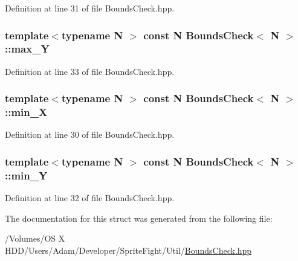 Definition at line 31 of file Bounds\-Check.\-hpp.

\hypertarget{struct_bounds_check_a569066d0fc5179aefddf172605682e72}{
\subsubsection[{max\-\_\-\-Y}]{\setlength{\rightskip}{0pt plus 5cm}template$<$typename N $>$ const N {\bf Bounds\-Check}$<$ N $>$\-::max\-\_\-\-Y}}\label{struct_bounds_check_a569066d0fc5179aefddf172605682e72}


Definition at line 33 of file Bounds\-Check.\-hpp.

\hypertarget{struct_bounds_check_a7ddafd0ac07f6ddfbd357f8bd440e952}{
\subsubsection[{min\-\_\-\-X}]{\setlength{\rightskip}{0pt plus 5cm}template$<$typename N $>$ const N {\bf Bounds\-Check}$<$ N $>$\-::min\-\_\-\-X}}\label{struct_bounds_check_a7ddafd0ac07f6ddfbd357f8bd440e952}


Definition at line 30 of file Bounds\-Check.\-hpp.

\hypertarget{struct_bounds_check_ab70f0f1fe16a50a94c7e937ce892ef38}{
\subsubsection[{min\-\_\-\-Y}]{\setlength{\rightskip}{0pt plus 5cm}template$<$typename N $>$ const N {\bf Bounds\-Check}$<$ N $>$\-::min\-\_\-\-Y}}\label{struct_bounds_check_ab70f0f1fe16a50a94c7e937ce892ef38}


Definition at line 32 of file Bounds\-Check.\-hpp.



The documentation for this struct was generated from the following file\-:\begin{DoxyCompactItemize}
\item 
/\-Volumes/\-O\-S X H\-D\-D/\-Users/\-Adam/\-Developer/\-Sprite\-Fight/\-Util/\hyperlink{_bounds_check_8hpp}{Bounds\-Check.\-hpp}\end{DoxyCompactItemize}
